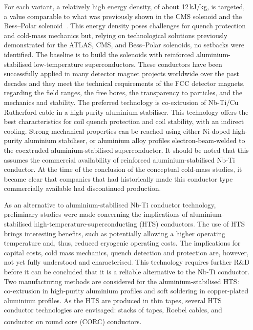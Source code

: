 For each variant, a relatively high energy density, of about 12\,kJ/kg, is targeted, 
a value comparable to what was previously shown in the CMS solenoid and the Bess--Polar solenoid~\cite{Yamamoto:2002dwn}. 
This energy density poses challenges for quench protection and cold-mass mechanics but, 
relying on technological solutions previously demonstrated for the ATLAS, CMS, and Bess--Polar solenoids, 
no setbacks were identified. 
The baseline is to build the solenoids with reinforced aluminium-stabilised low-temperature superconductors. 
These conductors have been successfully applied in many detector magnet projects worldwide over the past decades 
and they meet the technical requirements of the FCC detector magnets, 
regarding the field ranges, the free bores, the transparency to particles, and the mechanics and stability. 
The preferred technology is co-extrusion of Nb-Ti/Cu Rutherford cable in a high purity aluminium stabiliser. 
This technology offers the best characteristics for coil quench protection and coil stability, with an indirect cooling. 
Strong mechanical properties can be reached using either Ni-doped high-purity aluminium stabiliser, 
or aluminium alloy profiles electron-beam-welded to the coextruded aluminium-stabilised superconductor. 
It should be noted that this assumes the commercial availability of reinforced aluminium-stabilised Nb-Ti conductor. 
At the time of the conclusion of the conceptual cold-mass studies, 
it became clear that companies that had historically made this conductor type commercially available had discontinued production.

As an alternative to aluminium-stabilised Nb-Ti conductor technology, preliminary studies were made 
concerning the implications of aluminium-stabilised high-temperature-superconducting (HTS) conductors. 
The use of HTS brings interesting benefits, 
such as potentially allowing a higher operating temperature and, thus, reduced cryogenic operating costs.
The implications for capital costs, cold mass mechanics, quench detection and protection are, however, 
not yet fully understood and characterised. 
This technology requires further R\&D before it can be concluded that it is a reliable alternative to the Nb-Ti conductor.
Two manufacturing methods are considered for the aluminium-stabilised HTS: 
co-extrusion in high-purity aluminium profiles and soft soldering in copper-plated aluminium profiles. 
As the HTS are produced in thin tapes, several HTS conductor technologies are envisaged: 
stacks of tapes, Roebel cables, and conductor on round core (CORC\textsuperscript{\textregistered}) conductors.

